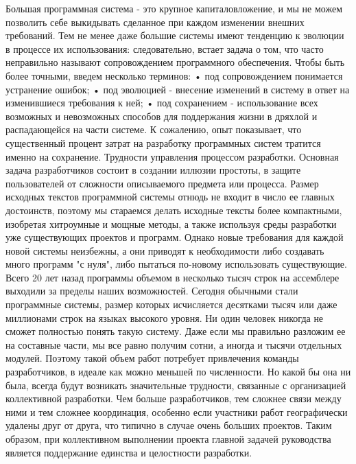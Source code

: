 \documentclass[11pt]{article}
\begin{document}
Большая программная система - это крупное капиталовложение, и мы не можем позволить себе выкидывать сделанное при каждом изменении внешних требований. Тем не менее даже большие системы имеют тенденцию к эволюции в процессе их использования: следовательно, встает задача о том, что часто неправильно называют сопровождением программного обеспечения. Чтобы быть более точными, введем несколько терминов: 
•	под сопровождением понимается устранение ошибок;
•	под эволюцией - внесение изменений в систему в ответ на изменившиеся требования к ней;
•	под сохранением - использование всех возможных и невозможных способов для поддержания жизни в дряхлой и распадающейся на части системе.
К сожалению, опыт показывает, что существенный процент затрат на разработку программных систем тратится именно на сохранение. 
Трудности управления процессом разработки. Основная задача разработчиков состоит в создании иллюзии простоты, в защите пользователей от сложности описываемого предмета или процесса. Размер исходных текстов программной системы отнюдь не входит в число ее главных достоинств, поэтому мы стараемся делать исходные тексты более компактными, изобретая хитроумные и мощные методы, а также используя среды разработки уже существующих проектов и программ. Однако новые требования для каждой новой системы неизбежны, а они приводят к необходимости либо создавать много программ "с нуля", либо пытаться по-новому использовать существующие. Всего 20 лет назад программы объемом в несколько тысяч строк на ассемблере выходили за пределы наших возможностей. Сегодня обычными стали программные системы, размер которых исчисляется десятками тысяч или даже миллионами строк на языках высокого уровня. Ни один человек никогда не сможет полностью понять такую систему. Даже если мы правильно разложим ее на составные части, мы все равно получим сотни, а иногда и тысячи отдельных модулей. Поэтому такой объем работ потребует привлечения команды разработчиков, в идеале как можно меньшей по численности. Но какой бы она ни была, всегда будут возникать значительные трудности, связанные с организацией коллективной разработки. Чем больше разработчиков, тем сложнее связи между ними и тем сложнее координация, особенно если участники работ географически удалены друг от друга, что типично в случае очень больших проектов. Таким образом, при коллективном выполнении проекта главной задачей руководства является поддержание единства и целостности разработки. 
\end{document}
